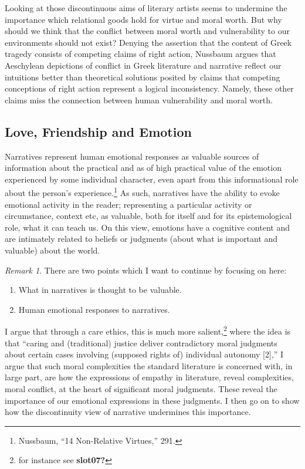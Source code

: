 \documentclass[phdthesis,12pt,final]{wuthesis}
\theoremstyle{definition}
\theoremstyle{definition}
\theoremstyle{definition}
\theoremstyle{definition}
\theoremstyle{remark}
\newtheorem*{remark}{Remark}
\begin{document}
Looking at those discontinuous aims of literary artists seems to undermine the importance which relational goods hold for virtue and moral worth. But why should we think that the conflict between moral worth and vulnerability to our environments should not exist? Denying the assertion that the content of Greek tragedy consists of competing claims of right action, Nussbaum argues that Aeschylean depictions of conflict in Greek literature and narrative reflect our intuitions better than theoretical solutions posited by claims that competing conceptions of right action represent a logical inconsistency. Namely, these other claims miss the connection between human vulnerability and moral worth.

\subsection*{Love, Friendship and Emotion}\label{love-friendship-and-emotion}

Narratives represent human emotional responses as valuable sources of information about the practical and as of high practical value of the emotion experienced by some individual character, even apart from this informational role about the person's experience.\footnote{Nussbaum, {``14 {Non-Relative Virtues},''} 291.} As such, narratives have the ability to evoke emotional activity in the reader; representing a particular activity or circumstance, context etc, as valuable, both for itself and for its epistemological role, what it can teach us. On this view, emotions have a cognitive content and are intimately related to beliefs or judgments (about what is important and valuable) about the world.

\begin{remark}

\noindent There are two points which I want to continue by focusing on here:

\begin{enumerate}
\def\labelenumi{\arabic{enumi}.}
\tightlist
\item
  What in narratives is thought to be valuable.
\item
  Human emotional responses to narratives.
\end{enumerate}

\end{remark}

I argue that through a care ethics, this is much more salient,\footnote{for instance see \textbf{slot07?}} where the idea is that ``caring and (traditional) justice deliver contradictory moral judgments about certain cases involving (supposed rights of) individual autonomy {[}2{]},'' I argue that such moral complexities the standard literature is concerned with, in large part, are how the expressions of empathy in literature, reveal complexities, moral conflict, at the heart of significant moral judgments. These reveal the importance of our emotional expressions in these judgments. I then go on to show how the discontinuity view of narrative undermines this importance.
\end{document}
